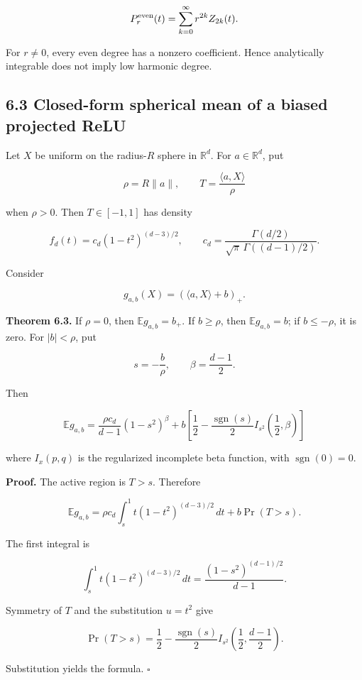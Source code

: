 \documentclass[
  10pt,
]{article}
\begin{document}
\[
P_r^{\rm even}(t)
=
\sum_{k=0}^{\infty}r^{2k}Z_{2k}(t).
\]

For \(r\ne0\), every even degree has a nonzero coefficient. Hence
analytically integrable does not imply low harmonic degree.

\subsection{6.3 Closed-form spherical mean of a biased projected
ReLU}\label{closed-form-spherical-mean-of-a-biased-projected-relu}

Let \(X\) be uniform on the radius-\(R\) sphere in \(\mathbb R^d\). For
\(a\in\mathbb R^d\), put

\[
\rho=R\|a\|,
\qquad
T=\frac{\langle a,X\rangle}{\rho}
\]

when \(\rho>0\). Then \(T\in[-1,1]\) has density

\[
f_d(t)=c_d(1-t^2)^{(d-3)/2},
\qquad
c_d=
\frac{\Gamma(d/2)}
{\sqrt\pi\,\Gamma((d-1)/2)}.
\]

Consider

\[
g_{a,b}(X)=(\langle a,X\rangle+b)_+.
\]

\textbf{Theorem 6.3.} If \(\rho=0\), then \(\mathbb E g_{a,b}=b_+\). If
\(b\ge\rho\), then \(\mathbb E g_{a,b}=b\); if \(b\le-\rho\), it is
zero. For \(|b|<\rho\), put

\[
s=-\frac b\rho,
\qquad
\beta=\frac{d-1}{2}.
\]

Then

\[
\boxed{
\mathbb E g_{a,b}
=
\frac{\rho c_d}{d-1}(1-s^2)^\beta
+
 b\left[
\frac12-
\frac{\operatorname{sgn}(s)}2
I_{s^2}\left(\frac12,\beta\right)
\right]
}
\]

where \(I_x(p,q)\) is the regularized incomplete beta function, with
\(\operatorname{sgn}(0)=0\).

\textbf{Proof.} The active region is \(T>s\). Therefore

\[
\mathbb E g_{a,b}
=
\rho c_d\int_s^1t(1-t^2)^{(d-3)/2}\,dt
+b\Pr(T>s).
\]

The first integral is

\[
\int_s^1t(1-t^2)^{(d-3)/2}\,dt
=
\frac{(1-s^2)^{(d-1)/2}}{d-1}.
\]

Symmetry of \(T\) and the substitution \(u=t^2\) give

\[
\Pr(T>s)
=
\frac12-
\frac{\operatorname{sgn}(s)}2
I_{s^2}\left(\frac12,\frac{d-1}{2}\right).
\]

Substitution yields the formula. \(\square\)
\end{document}
